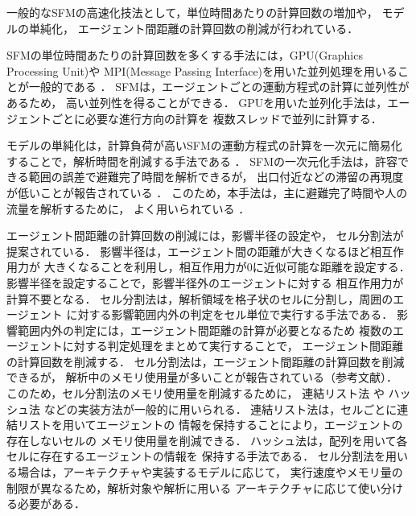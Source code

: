 一般的なSFMの高速化技法として，単位時間あたりの計算回数の増加や，
モデルの単純化，
エージェント間距離の計算回数の削減が行われている．

SFMの単位時間あたりの計算回数を多くする手法には，GPU(Graphics Processing Unit)や
MPI(Message Passing Interface)を用いた並列処理を用いることが一般的である
\cite{seru_sfm1}\cite{seru_sfm2}
\cite{sfm_gpu1}\cite{sfm_gpu2}\cite{sfm_gpu3}\cite{sfm_gpu4}
\cite{mpi1}\cite{mpi2}．
SFMは，エージェントごとの運動方程式の計算に並列性があるため，
高い並列性を得ることができる．
GPUを用いた並列化手法は，エージェントごとに必要な進行方向の計算を
複数スレッドで並列に計算する．

モデルの単純化は，計算負荷が高いSFMの運動方程式の計算を一次元に簡易化
することで，解析時間を削減する手法である
\cite{1jigen_model}\cite{1jigen_model1}\cite{1jigen_model2}．
SFMの一次元化手法は，許容できる範囲の誤差で避難完了時間を解析できるが，
出口付近などの滞留の再現度が低いことが報告されている
\cite{1jigen_model2}．
このため，本手法は，主に避難完了時間や人の流量を解析するために，
よく用いられている
\cite{1jigen_katuyou}\cite{1jigen_model_ev1}\cite{1jigen_model_ev2}．

エージェント間距離の計算回数の削減には，影響半径の設定や，
セル分割法が提案されている\cite{cell1}\cite{cell2}．
影響半径は，エージェント間の距離が大きくなるほど相互作用力が
大きくなることを利用し，相互作用力が0に近似可能な距離を設定する．
影響半径を設定することで，影響半径外のエージェントに対する
相互作用力が計算不要となる\cite{eikyo_space}．
セル分割法は，解析領域を格子状のセルに分割し，周囲のエージェント
に対する影響範囲内外の判定をセル単位で実行する手法である．
影響範囲内外の判定には，エージェント間距離の計算が必要となるため
複数のエージェントに対する判定処理をまとめて実行することで，
エージェント間距離の計算回数を削減する．
セル分割法は，エージェント間距離の計算回数を削減できるが，
解析中のメモリ使用量が多いことが報告されている（参考文献）．
このため，セル分割法のメモリ使用量を削減するために，
連結リスト法\cite{cell_book1}\cite{cell_book}\cite{cellrenketu}
や
ハッシュ法\cite{hash}
などの実装方法が一般的に用いられる．
連結リスト法は，セルごとに連結リストを用いてエージェントの
情報を保持することにより，エージェントの存在しないセルの
メモリ使用量を削減できる．
ハッシュ法は，配列を用いて各セルに存在するエージェントの情報を
保持する手法である．
セル分割法を用いる場合は，アーキテクチャや実装するモデルに応じて，
実行速度やメモリ量の制限が異なるため，解析対象や解析に用いる
アーキテクチャに応じて使い分ける必要がある．

